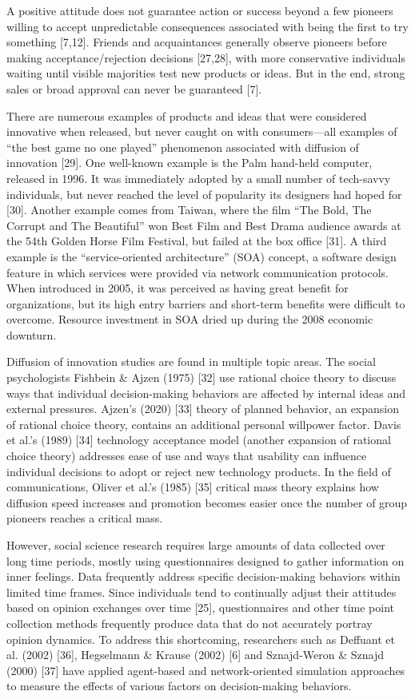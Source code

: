 \documentclass[10pt,letterpaper]{article}
\begin{document}
A positive attitude does not guarantee action or success beyond a few pioneers willing to accept unpredictable consequences associated with being the first to try something [7,12]. Friends and acquaintances generally observe pioneers before making acceptance/rejection decisions [27,28], with more conservative individuals waiting until visible majorities test new products or ideas. But in the end, strong sales or broad approval can never be guaranteed [7].

There are numerous examples of products and ideas that were considered innovative when released, but never caught on with consumers---all examples of ``the best game no one played'' phenomenon associated with diffusion of innovation [29]. One well-known example is the Palm hand-held computer, released in 1996. It was immediately adopted by a small number of tech-savvy individuals, but never reached the level of popularity its designers had hoped for [30]. Another example comes from Taiwan, where the film ``The Bold, The Corrupt and The Beautiful'' won Best Film and Best Drama audience awards at the 54th Golden Horse Film Festival, but failed at the box office [31]. A third example is the ``service-oriented architecture'' (SOA) concept, a software design feature in which services were provided via network communication protocols. When introduced in 2005, it was perceived as having great benefit for organizations, but its high entry barriers and short-term benefits were difficult to overcome. Resource investment in SOA dried up during the 2008 economic downturn.

Diffusion of innovation studies are found in multiple topic areas. The social psychologists Fishbein \& Ajzen (1975) [32] use rational choice theory to discuss ways that individual decision-making behaviors are affected by internal ideas and external pressures. Ajzen's (2020) [33] theory of planned behavior, an expansion of rational choice theory, contains an additional personal willpower factor. Davis et al.'s (1989) [34] technology acceptance model (another expansion of rational choice theory) addresses ease of use and ways that usability can influence individual decisions to adopt or reject new technology products. In the field of communications, Oliver et al.'s (1985) [35] critical mass theory explains how diffusion speed increases and promotion becomes easier once the number of group pioneers reaches a critical mass.

However, social science research requires large amounts of data collected over long time periods, mostly using questionnaires designed to gather information on inner feelings. Data frequently address specific decision-making behaviors within limited time frames. Since individuals tend to continually adjust their attitudes based on opinion exchanges over time [25], questionnaires and other time point collection methods frequently produce data that do not accurately portray opinion dynamics. To address this shortcoming, researchers such as Deffuant et al. (2002) [36], Hegselmann \& Krause (2002) [6] and Sznajd-Weron \& Sznajd (2000) [37] have applied agent-based and network-oriented simulation approaches to measure the effects of various factors on decision-making behaviors.
\end{document}
